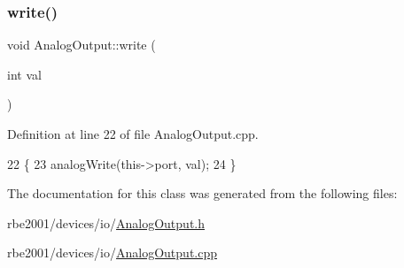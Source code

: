\subsubsection{\texorpdfstring{write()}{write()}}
{\footnotesize\ttfamily void Analog\+Output\+::write (\begin{DoxyParamCaption}\item[{int}]{val }\end{DoxyParamCaption})}



Definition at line 22 of file Analog\+Output.\+cpp.


\begin{DoxyCode}
22                                 \{
23     analogWrite(this->port, val);
24 \}
\end{DoxyCode}


The documentation for this class was generated from the following files\+:\begin{DoxyCompactItemize}
\item 
rbe2001/devices/io/\hyperlink{_analog_output_8h}{Analog\+Output.\+h}\item 
rbe2001/devices/io/\hyperlink{_analog_output_8cpp}{Analog\+Output.\+cpp}\end{DoxyCompactItemize}
